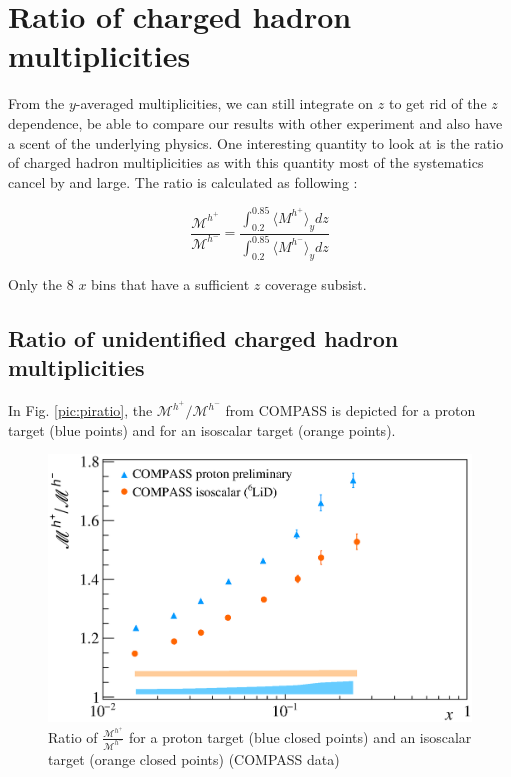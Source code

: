 \newpage

\section{Ratio of charged hadron multiplicities}

From the $y$-averaged multiplicities, we can still integrate on $z$ to get rid of the $z$ dependence, be able to compare our results with other experiment and also have a scent of the underlying physics. One interesting quantity to look at is the ratio of charged hadron multiplicities as with this quantity most of the systematics cancel by and large. The ratio is calculated as following :

\begin{equation}
  \frac{\mathscr{M}^{h^+}}{\mathscr{M}^{h^-}} = \frac{\int_{0.2}^{0.85} \langle M^{h^+} \rangle_y dz}{\int_{0.2}^{0.85} \langle M^{h^-} \rangle_y dz}
\end{equation}

Only the 8 $x$ bins that have a sufficient $z$ coverage subsist.

\subsection{Ratio of unidentified charged hadron multiplicities}

In Fig. \ref{pic:piratio}, the $\mathscr{M}^{h^+}/\mathscr{M}^{h^-}$ from COMPASS is depicted for a proton target (blue points) and for an isoscalar target (orange points).

\begin{figure}[!h]
  \centering
	\includegraphics[scale=0.5]{./gfx/Mult_h_ratio.eps}
	\caption{Ratio of $\frac{\mathscr{M}^{h^+}}{\mathscr{M}^{h^-}}$ for a proton target (blue closed points) and an isoscalar target (orange closed points) (COMPASS data)}
	\label{pic:hratio}
\end{figure}

